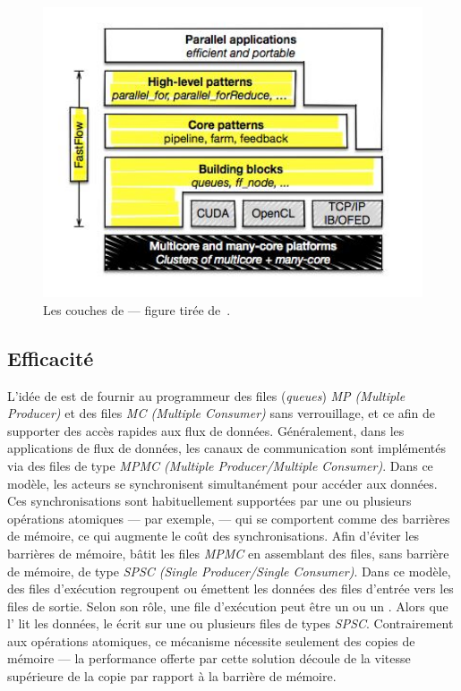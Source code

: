 \begin{figure}[ht]
\centering
     \includegraphics[width=1.0\textwidth]{Figures/FastFlowLayers.jpg}
      \caption[Les couches de .]{Les couches de  --- figure tir\'ee de~\cite{Torquati15}.}
       \label{FastFlowLayers.fig}
\end{figure}

\subsection{Efficacit\'e}

L'id\'ee de  est de fournir au programmeur des files (\emph{queues}) \emph{MP (Multiple Producer)} et des files \emph{MC (Multiple Consumer)} sans verrouillage, et ce afin de supporter des acc\`es rapides aux flux de donn\'ees. G\'en\'eralement, dans les applications de flux de donn\'ees, les canaux de communication sont impl\'ementés via des files de type \emph{MPMC (Multiple Producer/Multiple Consumer)}. Dans ce modèle, les acteurs se synchronisent simultanément pour acc\'eder aux donn\'ees. Ces synchronisations sont habituellement support\'ees par une ou plusieurs op\'erations atomiques --- par exemple,  --- qui se comportent comme des barri\`eres de m\'emoire, ce qui augmente le co\^ut des synchronisations. Afin d'\'eviter les barri\`eres de m\'emoire,  b\^atit les files \emph{MPMC} en assemblant des files, sans barri\`ere de m\'emoire, de type \emph{SPSC (Single Producer/Single Consumer)}. Dans ce mod\`ele, des files d’ex\'ecution regroupent ou \'emettent les donn\'ees des files d'entr\'ee vers les files de sortie. Selon son r\^ole, une file d'ex\'ecution peut \^etre un  ou un . Alors que l' lit les donn\'ees, le  \'ecrit sur une ou plusieurs files de types \emph{SPSC}. Contrairement aux op\'erations atomiques, ce m\'ecanisme n\'ecessite seulement des copies de m\'emoire --- la performance offerte par cette solution d\'ecoule de la vitesse sup\'erieure de la copie par rapport \`a la barri\`ere de m\'emoire.


